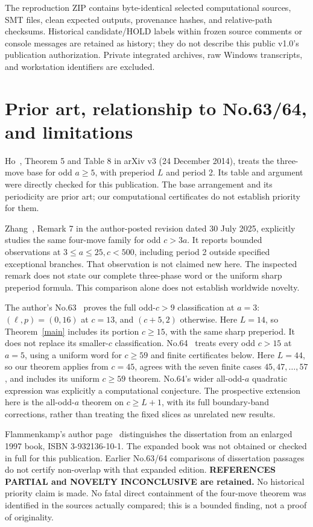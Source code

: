 \documentclass[10pt,a4paper]{article}
\begin{document}
The reproduction ZIP contains byte-identical selected computational sources, SMT files, clean expected outputs, provenance hashes, and relative-path checksums. Historical candidate/HOLD labels within frozen source comments or console messages are retained as history; they do not describe this public v1.0's publication authorization. Private integrated archives, raw Windows transcripts, and workstation identifiers are excluded.

\section{Prior art, relationship to No.63/64, and limitations}
Ho~\cite{Ho}, Theorem 5 and Table 8 in arXiv v3 (24 December 2014), treats the three-move base for odd $a\ge5$, with preperiod $L$ and period 2. Its table and argument were directly checked for this publication. The base arrangement and its periodicity are prior art; our computational certificates do not establish priority for them.

Zhang~\cite{Zhang}, Remark 7 in the author-posted revision dated 30 July 2025, explicitly studies the same four-move family for odd $c>3a$. It reports bounded observations at $3\le a\le25,c<500$, including period 2 outside specified exceptional branches. That observation is not claimed new here. The inspected remark does not state our complete three-phase word or the uniform sharp preperiod formula. This comparison alone does not establish worldwide novelty.

The author's No.63~\cite{Y63} proves the full odd-$c>9$ classification at $a=3$: $(\ell,p)=(0,16)$ at $c=13$, and $(c+5,2)$ otherwise. Here $L=14$, so Theorem~\ref{main} includes its portion $c\ge15$, with the same sharp preperiod. It does not replace its smaller-$c$ classification. No.64~\cite{Y64} treats every odd $c>15$ at $a=5$, using a uniform word for $c\ge59$ and finite certificates below. Here $L=44$, so our theorem applies from $c=45$, agrees with the seven finite cases $45,47,\ldots,57$, and includes its uniform $c\ge59$ theorem. No.64's wider all-odd-$a$ quadratic expression was explicitly a computational conjecture. The prospective extension here is the all-odd-$a$ theorem on $c\ge L+1$, with its full boundary-band corrections, rather than treating the fixed slices as unrelated new results.

Flammenkamp's author page~\cite{Flammenkamp} distinguishes the dissertation from an enlarged 1997 book, ISBN 3-932136-10-1. The expanded book was not obtained or checked in full for this publication. Earlier No.63/64 comparisons of dissertation passages do not certify non-overlap with that expanded edition. \textbf{REFERENCES PARTIAL and NOVELTY INCONCLUSIVE are retained.} No historical priority claim is made. No fatal direct containment of the four-move theorem was identified in the sources actually compared; this is a bounded finding, not a proof of originality.
\end{document}

